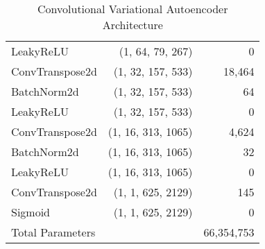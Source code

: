 \begin{table}[!h]
\begin{tabular}{lrr}
        LeakyReLU & (1, 64, 79, 267) & 0 \\
        ConvTranspose2d & (1, 32, 157, 533) & 18,464 \\
        BatchNorm2d & (1, 32, 157, 533) & 64 \\
        LeakyReLU & (1, 32, 157, 533) & 0 \\
        ConvTranspose2d & (1, 16, 313, 1065) & 4,624 \\
        BatchNorm2d & (1, 16, 313, 1065) & 32 \\
        LeakyReLU & (1, 16, 313, 1065) & 0 \\
        ConvTranspose2d & (1, 1, 625, 2129) & 145 \\
        Sigmoid & (1, 1, 625, 2129) & 0 \\
        \midrule
        Total Parameters & & 66,354,753 \\
        \bottomrule
    \end{tabular}
    \caption{Convolutional Variational Autoencoder Architecture}
    \label{tab:cvae}
\end{table}


